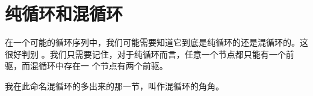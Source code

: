 \section{纯循环和混循环} \label{sec:纯循环和混循环}
在一个可能的循环序列中，我们可能需要知道它到底是纯循环的还是混循环的。这很好判别
。我们只需要记住，对于纯循环而言，任意一个节点都只能有一个前驱，而混循环中存在一
个节点有两个前驱。

我在此命名混循环的多出来的那一节，叫作混循环的角角。
